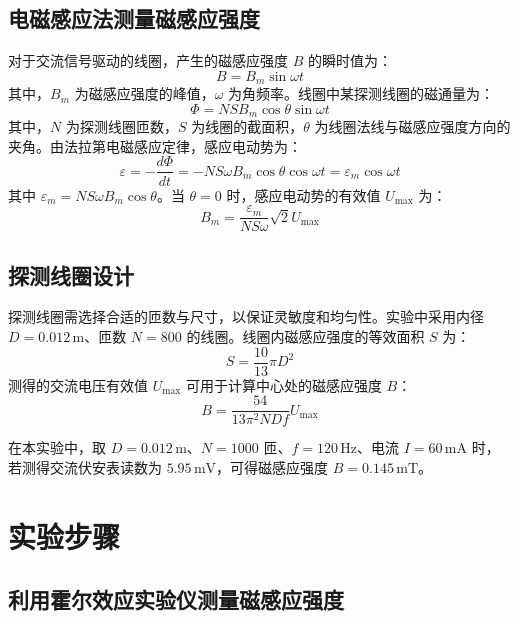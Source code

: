 \documentclass[a4paper,10pt]{article}
\begin{document}
\subsection{电磁感应法测量磁感应强度}
对于交流信号驱动的线圈，产生的磁感应强度 \( B \) 的瞬时值为：
\[
B = B_m \sin \omega t
\]
其中，\( B_m \) 为磁感应强度的峰值，\( \omega \) 为角频率。线圈中某探测线圈的磁通量为：
\[
\Phi = NS B_m \cos \theta \sin \omega t
\]
其中，\( N \) 为探测线圈匝数，\( S \) 为线圈的截面积，\( \theta \) 为线圈法线与磁感应强度方向的夹角。由法拉第电磁感应定律，感应电动势为：
\[
\varepsilon = -\frac{d \Phi}{dt} = -NS \omega B_m \cos \theta \cos \omega t = \varepsilon_m \cos \omega t
\]
其中 \( \varepsilon_m = NS \omega B_m \cos \theta \)。当 \( \theta = 0 \) 时，感应电动势的有效值 \( U_{\text{max}} \) 为：
\[
B_m = \frac{\varepsilon_m}{NS \omega} \sqrt{2} U_{\text{max}}
\]

\subsection{探测线圈设计}
探测线圈需选择合适的匝数与尺寸，以保证灵敏度和均匀性。实验中采用内径 \( D = 0.012 \, \text{m} \)、匝数 \( N = 800 \) 的线圈。线圈内磁感应强度的等效面积 \( S \) 为：
\[
S = \frac{10}{13} \pi D^2
\]
测得的交流电压有效值 \( U_{\text{max}} \) 可用于计算中心处的磁感应强度 \( B \)：
\[
B = \frac{54}{13 \pi^2 N D f} U_{\text{max}}
\]

在本实验中，取 \( D = 0.012 \, \text{m} \)、\( N = 1000 \) 匝、\( f = 120 \, \text{Hz} \)、电流 \( I = 60 \, \text{mA} \) 时，若测得交流伏安表读数为 \( 5.95 \, \text{mV} \)，可得磁感应强度 \( B = 0.145 \, \text{mT} \)。

\section{实验步骤}

\subsection{利用霍尔效应实验仪测量磁感应强度}
\end{document}
